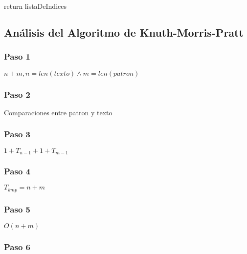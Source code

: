 \begin{algorithm} [H]
    \begin{algorithmic} [1]
    \EndIf
    \EndWhile
    \EndProcedure
    \State return listaDeIndices
    \EndProcedure
        
    \end{algorithmic}
\end{algorithm}



\subsection*{Análisis del Algoritmo de Knuth-Morris-Pratt}
\subsubsection*{Paso 1}
$n + m, n = len(texto) \land m = len(patron)$

\subsubsection*{Paso 2}
Comparaciones entre patron y texto

\subsubsection*{Paso 3}
$1 + T_{n-1} + 1 + T_{m-1}$

\subsubsection*{Paso 4}
$T_{kmp} = n + m$

\subsubsection*{Paso 5}
$O(n+m)$

\subsubsection*{Paso 6}



